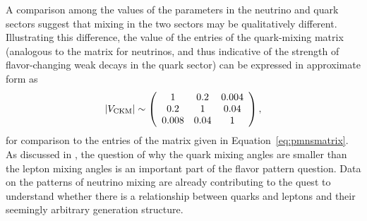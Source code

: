 A comparison among the values of the parameters in the neutrino
and quark sectors suggest that mixing in the two sectors may be
qualitatively different. Illustrating this difference, the value of
the entries of the  %
quark-mixing matrix (analogous to the  matrix for
neutrinos, and thus indicative of the strength of flavor-changing weak
decays in the quark sector) can be expressed in approximate form as
\begin{equation}
|V_{\rm CKM}|\sim \left(\begin{array}{ccc} 1 & 0.2 & 0.004\\ 0.2 & 1 & 0.04 \\ 0.008 & 0.04 & 1\end{array} \right),
\label{eq:ckmmatrix}
\end{equation}
for comparison to the entries of the  matrix given in Equation~\ref{eq:pmnsmatrix}.
As discussed in \cite{King:2014nza}, the question of why the quark mixing angles are
smaller than the lepton mixing angles is an important part of the %
flavor pattern question. Data on the patterns of neutrino mixing are already contributing to the quest to understand whether there is a relationship between quarks and leptons and their seemingly arbitrary generation structure.   



